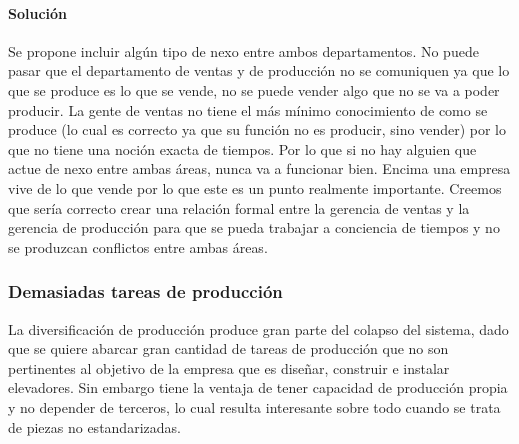 \documentclass[12pt,a4paper,spanish]{article}
\begin{document}
\paragraph{Soluci\'on}
Se propone incluir alg\'un tipo de nexo entre ambos departamentos. No puede pasar que el departamento de ventas y de producci\'on no se comuniquen ya que lo que se produce es lo que se vende, no se puede vender algo que no se va a poder producir. La gente de ventas no tiene el m\'as m\'inimo conocimiento de como se produce (lo cual es correcto ya que su funci\'on no es producir, sino vender) por lo que no tiene una noci\'on exacta de tiempos. Por lo que si no hay alguien que actue de nexo entre ambas \'areas, nunca va a funcionar bien. Encima una empresa vive de lo que vende por lo que este es un punto realmente importante. Creemos que ser\'ia correcto crear una relaci\'on formal entre la gerencia de ventas y la gerencia de producci\'on para que se pueda trabajar a conciencia de tiempos y no se produzcan conflictos entre ambas \'areas.

\subsubsection{Demasiadas tareas de producci\'on}
La diversificaci\'on de producci\'on produce gran parte del colapso del sistema, dado que se quiere abarcar gran cantidad de tareas de producci\'{o}n que no son pertinentes al objetivo de la empresa que es dise\~nar, construir e instalar elevadores. Sin embargo tiene la ventaja de tener capacidad de producci\'on propia y no depender de terceros, lo cual resulta interesante sobre todo cuando se trata de piezas no estandarizadas.
\end{document}

